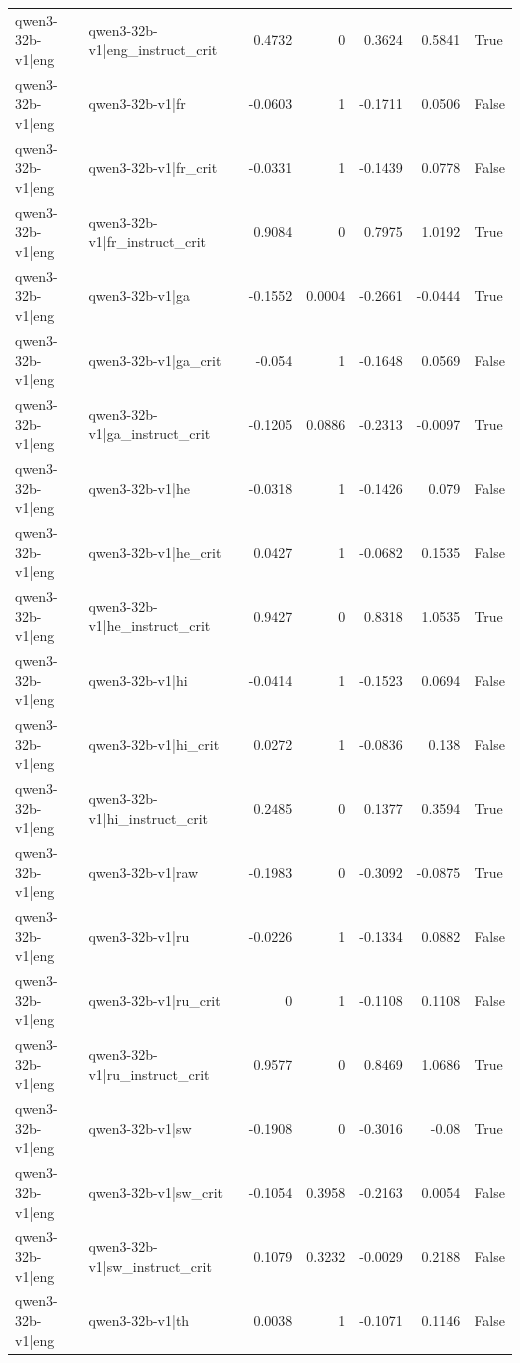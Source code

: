 \begin{table}
\begin{tabular}{l l r r r r l}
qwen3-32b-v1|eng & qwen3-32b-v1|eng_instruct_crit & 0.4732 & 0 & 0.3624 & 0.5841 & True \\
qwen3-32b-v1|eng & qwen3-32b-v1|fr & -0.0603 & 1 & -0.1711 & 0.0506 & False \\
qwen3-32b-v1|eng & qwen3-32b-v1|fr_crit & -0.0331 & 1 & -0.1439 & 0.0778 & False \\
qwen3-32b-v1|eng & qwen3-32b-v1|fr_instruct_crit & 0.9084 & 0 & 0.7975 & 1.0192 & True \\
qwen3-32b-v1|eng & qwen3-32b-v1|ga & -0.1552 & 0.0004 & -0.2661 & -0.0444 & True \\
qwen3-32b-v1|eng & qwen3-32b-v1|ga_crit & -0.054 & 1 & -0.1648 & 0.0569 & False \\
qwen3-32b-v1|eng & qwen3-32b-v1|ga_instruct_crit & -0.1205 & 0.0886 & -0.2313 & -0.0097 & True \\
qwen3-32b-v1|eng & qwen3-32b-v1|he & -0.0318 & 1 & -0.1426 & 0.079 & False \\
qwen3-32b-v1|eng & qwen3-32b-v1|he_crit & 0.0427 & 1 & -0.0682 & 0.1535 & False \\
qwen3-32b-v1|eng & qwen3-32b-v1|he_instruct_crit & 0.9427 & 0 & 0.8318 & 1.0535 & True \\
qwen3-32b-v1|eng & qwen3-32b-v1|hi & -0.0414 & 1 & -0.1523 & 0.0694 & False \\
qwen3-32b-v1|eng & qwen3-32b-v1|hi_crit & 0.0272 & 1 & -0.0836 & 0.138 & False \\
qwen3-32b-v1|eng & qwen3-32b-v1|hi_instruct_crit & 0.2485 & 0 & 0.1377 & 0.3594 & True \\
qwen3-32b-v1|eng & qwen3-32b-v1|raw & -0.1983 & 0 & -0.3092 & -0.0875 & True \\
qwen3-32b-v1|eng & qwen3-32b-v1|ru & -0.0226 & 1 & -0.1334 & 0.0882 & False \\
qwen3-32b-v1|eng & qwen3-32b-v1|ru_crit & 0 & 1 & -0.1108 & 0.1108 & False \\
qwen3-32b-v1|eng & qwen3-32b-v1|ru_instruct_crit & 0.9577 & 0 & 0.8469 & 1.0686 & True \\
qwen3-32b-v1|eng & qwen3-32b-v1|sw & -0.1908 & 0 & -0.3016 & -0.08 & True \\
qwen3-32b-v1|eng & qwen3-32b-v1|sw_crit & -0.1054 & 0.3958 & -0.2163 & 0.0054 & False \\
qwen3-32b-v1|eng & qwen3-32b-v1|sw_instruct_crit & 0.1079 & 0.3232 & -0.0029 & 0.2188 & False \\
qwen3-32b-v1|eng & qwen3-32b-v1|th & 0.0038 & 1 & -0.1071 & 0.1146 & False \\

\end{tabular}
\end{table}
